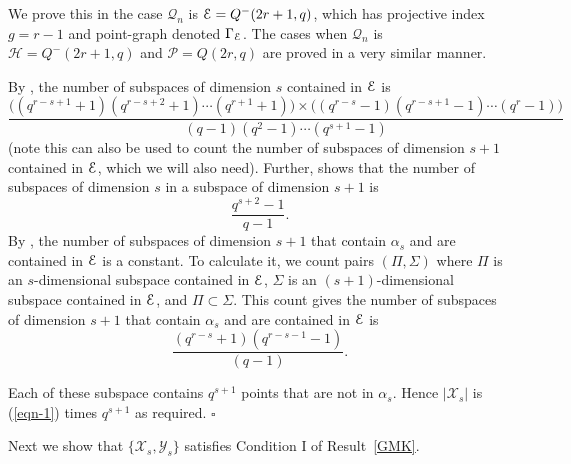 \documentclass[12pt]{article}
\newenvironment{proof}{\noindent{\bf Proof}\hspace{0.5em}}
    { \null  \hfill $\square$ \par}
\newcommand{\X}{\mathcal X}
\newcommand{\Y}{\mathcal Y}
\newcommand\E{{\cal E}}
\renewcommand{\P}{\mathcal P}
\renewcommand{\H}{\mathcal H}
\newcommand{\Q}{\mathscr Q}
\begin{document}
\begin{proof}
We prove this in the case $\Q_n$ is $\E=Q^-(2r+1,q)$, which has projective index $g=r-1$ and point-graph denoted $\Gamma_\E$. The cases when $\Q_n$ is $\H=Q^-(2r+1,q)$ and $\P=Q(2r,q)$ are proved in a very similar manner. 

 By \cite[Theorem 22.5.1]{HT},  the number of subspaces of dimension $s$ contained in $\E$ is $$\frac{\Big((q^{r-s+1}+1)(q^{r-s+2}+1)\cdots(q^{r+1}+1)\Big)\times \Big((q^{r-s}-1)(q^{r-s+1}-1)\cdots(q^r-1)\Big)}{(q-1)(q^2-1)\cdots(q^{s+1}-1)}$$ (note this can also be used to count the number of subspaces of dimension $s+1$ contained in $\E$,  which we will also need).
Further, \cite[Theorem 3.1]{hirs98} shows that the number of subspaces of dimension $s$ in a subspace of dimension $s+1$ is
$$\frac{q^{s+2}-1}{q-1}.$$
By \cite{HT}, the number of subspaces of dimension $s+1$ that contain $\alpha_s$ and are contained in $\E$ is a constant. To calculate it, we
 count  pairs
 $(\Pi,\Sigma)$ where $\Pi$ is an $s$-dimensional subspace contained in $\E$, $\Sigma$ is an $(s+1)$-dimensional subspace contained in $\E$, and $\Pi\subset\Sigma$. 
 This count gives the number of subspaces of dimension $s+1$ that contain $\alpha_s$ and are contained in $\E$ is 
 \begin{equation}\label{eqn-1}
\frac{ (q^{r-s}+1)(q^{r-s-1}-1)}{(q-1)}. 
 \end{equation}




 Each of these subspace contains $q^{s+1}$ points that are not in $\alpha_s$. Hence $|\X_s|$ is (\ref{eqn-1}) times  $q^{s+1}$ as required.
\end{proof}


Next we show that $\{\X_s,\Y_s\}$ satisfies Condition I of Result~\ref{GMK}.
\end{document}
